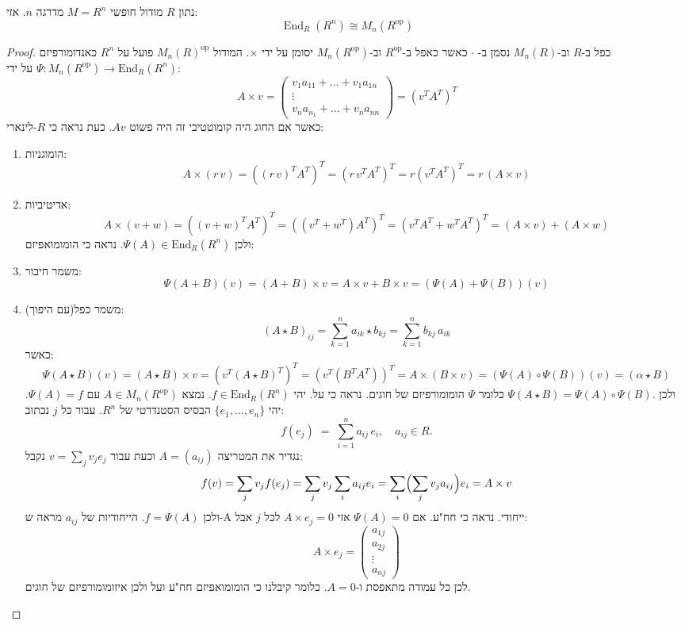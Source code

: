 \documentclass{tstextbook}
\begin{document}
\begin{proposition}
נתון \(R\) מודול חופשי \(M=R^{n}\) מדרגה \(n\). אזי:
$$\operatorname{End}_{R}(R^{n})\cong M_{n}(R^{\mathrm{op}})$$

\end{proposition}
\begin{proof}
כפל ב-\(R\) וב-\(M_{n}(R)\) נסמן ב- \(\cdot\) כאשר כאפל ב-\(R^{\text{op}}\) וב-\(M_{n}(R^{\text{op}})\) יסומן על ידי \(\times\).
המודול \(M_{n}(R)^{\text{op}}\) פועל על \(R^{n}\) כאנדומורפיזם \(\Psi:M_{n}(R^{\text{op}})\to \mathrm{End}_{R}(R^{n})\) על ידי: 
$$A\times v = \begin{pmatrix}v_{1}a_{11}+\dots+v_{1}a_{1n} \\\vdots \\v_{n}a_{n_{1}}+\dots+v_{n}a_{nn}
\end{pmatrix}=(v^{T}A^{T})^{T}$$
כאשר אם החוג היה קומוטטיבי זה היה פשוט \(Av\). כעת נראה כי \(R\)-לינארי:

  \begin{enumerate}
    \item הומוגניות: 
$$A\times(r\,v)=\left((r\,v)^{T}A^{T}\right)^{T}=\left(r\,v^{T}A^{T}\right)^{T}=r\left(v^{T}A^{T}\right)^{T}=r\,(A\times v)$$


    \item אדיטיביות: 
$$A\times(v+w)=\left((v+w)^{T}A^{T}\right)^{T}=\left((v^{T}+w^{T})A^{T}\right)^{T}=\left(v^{T}A^{T}+w^{T}A^{T}\right)^{T}=(A\times v)+(A\times w)$$
ולכן \(\Psi(A)\in \mathrm{End}_{R}(R^{n})\). נראה כי הומומואפיזם:


    \item משמר חיבור: 
$$\Psi(A+B)(v)=(A+B)\times v=A\times v+B\times v=(\Psi(A)+\Psi(B))(v)$$


    \item משמר כפל(עם היפוך): 
$$(A\star B)_{i j}=\sum_{k=1}^{n}a_{i k}\star b_{k j}=\sum_{k=1}^{n}b_{k j}\,a_{i k}$$
כאשר:
$$\Psi(A\star B)(v)=(A\star B)\times v=\left(v^{T}(A\star B)^{T}\right)^{T}=\left(v^{T}(B^{T}A^{T})\right)^{T}=A\times(B\times v)=(\Psi(A)\circ\Psi(B))(v)=(\alpha\star B)$$
ולכן \(\Psi(A\star B)=\Psi(A)\circ\Psi(B).\) כלומר \(\Psi\) הומומורפיזם של חוגים. נראה כי על. יהי \(f\in \mathrm{End}_{R}(R^{n})\). נמצא \(A \in M_{n}(R^{\text{op}})\) עם \(\Psi(A)=f\). יהי \(\{ e_{1},\dots,e_{n}  \}\) הבסיס הסטנדרטי של \(R^{n}\). עבור כל \(j\) נכתוב:
$$f(e_{j})\;=\;\sum_{i=1}^{n}a_{i j}\,e_{i},\quad a_{i j}\in R.$$
נגדיר את המטריצה \(A=(a_{ij})\) וכעת עבור \(v=\sum_{j}v_{j}e_{j}\) נקבל:
$$f(v)=\sum_{j}v_{j}f(e_{j})=\sum_{j}v_{j}\sum_{i}a_{i j}e_{i}=\sum_{i}\Bigl(\sum_{j}v_{j}a_{i j}\Bigr)e_{i}=A\times v$$
ולכן \(f=\Psi(A)\). הייחודיות של \(a_{ij}\) מראה ש-A ייחודי. נראה כי חח"ע. אם \(\Psi(A)=0\) אזי \(A\times e_{j}=0\) לכל \(j\) אבל:
$$A\times e_{j}=\begin{pmatrix}a_{1j}\\ a_{2j}\\ \vdots\\a_{nj}
\end{pmatrix}$$
לכן כל עמודה מתאפסת ו-\(A=0\). כלומר קיבלנו כי הומומואפיזם חח"ע ועל ולכן איזומומורפיזם של חוגים.


  \end{enumerate}
\end{proof}
\end{document}
